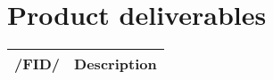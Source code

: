\chapter{Product deliverables}
\begin{tabular}{|l | l|}
   \hline
  /FID/ & Description \\
   \hline
\end{tabular}
